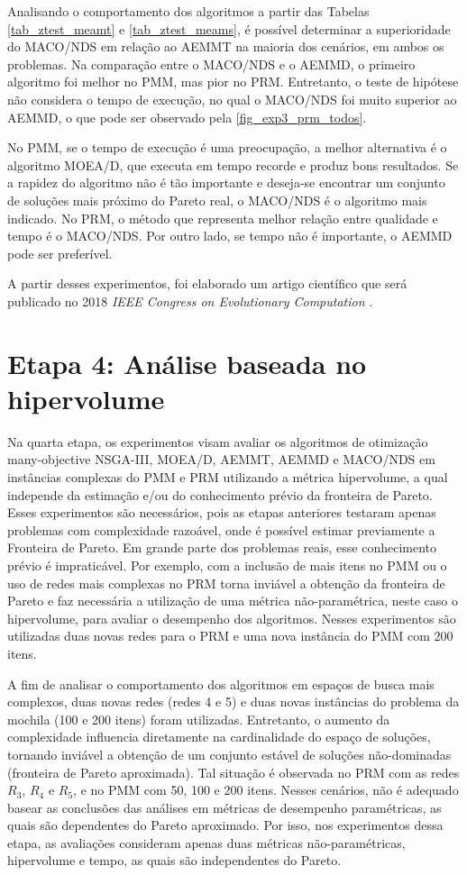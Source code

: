 Analisando o comportamento dos algoritmos a partir das Tabelas \ref{tab_ztest_meamt} e \ref{tab_ztest_meams}, é possível determinar a superioridade do MACO/NDS em relação ao AEMMT na maioria dos cenários, em ambos os problemas. Na comparação entre o MACO/NDS e o AEMMD, o primeiro algoritmo foi melhor no PMM, mas pior no PRM. Entretanto, o teste de hipótese não considera o tempo de execução, no qual o MACO/NDS foi muito superior ao AEMMD, o que pode ser observado pela \ref{fig_exp3_prm_todos}.

No PMM, se o tempo de execução é uma preocupação, a melhor alternativa é o algoritmo MOEA/D, que executa em tempo recorde e produz bons resultados. Se a rapidez do algoritmo não é tão importante e deseja-se encontrar um conjunto de soluções mais próximo do Pareto real, o MACO/NDS é o algoritmo mais indicado. No PRM, o método que representa melhor relação entre qualidade e tempo é o MACO/NDS. Por outro lado, se tempo não é importante, o AEMMD pode ser preferível.

A partir desses experimentos, foi elaborado um artigo científico que será publicado no 2018 \textit{IEEE Congress on Evolutionary Computation} \cite{Franca2018}.

\section{Etapa 4: Análise baseada no hipervolume}
\label{section_experimentos_etapa4}

Na quarta etapa, os experimentos visam avaliar os algoritmos de otimização many-objective NSGA-III, MOEA/D, AEMMT, AEMMD e MACO/NDS em instâncias complexas do PMM e PRM utilizando a métrica hipervolume, a qual independe da estimação e/ou do conhecimento prévio da fronteira de Pareto. Esses experimentos são necessários, pois as etapas anteriores testaram apenas problemas com complexidade razoável, onde é possível estimar previamente a Fronteira de Pareto. Em grande parte dos problemas reais, esse conhecimento prévio é impraticável. Por exemplo, com a inclusão de mais itens no PMM ou o uso de redes mais complexas no PRM torna inviável a obtenção da fronteira de Pareto e faz necessária a utilização de uma métrica não-paramétrica, neste caso o hipervolume, para avaliar o desempenho dos algoritmos. Nesses experimentos são utilizadas duas novas redes para o PRM e uma nova instância do PMM com 200 itens.

A fim de analisar o comportamento dos algoritmos em espaços de busca mais complexos, duas novas redes (redes 4 e 5) e duas novas instâncias do problema da mochila (100 e 200 itens) foram utilizadas. Entretanto, o aumento da complexidade influencia diretamente na cardinalidade do espaço de soluções, tornando inviável a obtenção de um conjunto estável de soluções não-dominadas (fronteira de Pareto aproximada). Tal situação é observada no PRM com as redes $R_3$, $R_4$ e $R_5$, e no PMM com 50, 100 e 200 itens. Nesses cenários, não é adequado basear as conclusões das análises em métricas de desempenho paramétricas, as quais são dependentes do Pareto aproximado. Por isso, nos experimentos dessa etapa, as avaliações consideram apenas duas métricas não-paramétricas, hipervolume e tempo, as quais são independentes do Pareto.

